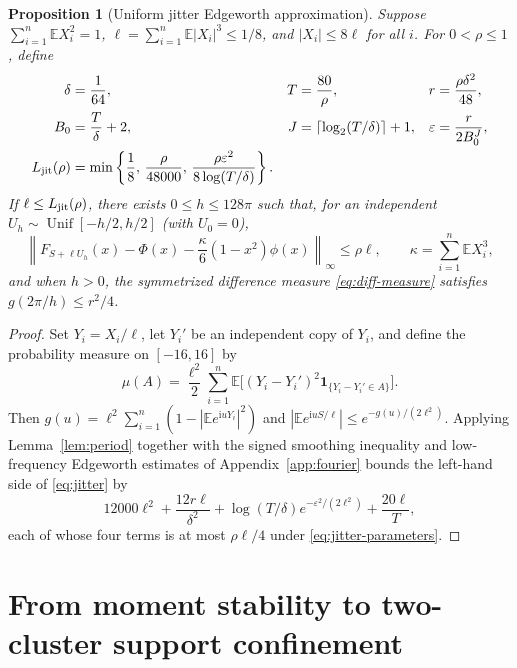 \documentclass[11pt]{article}
\numberwithin{equation}{section}
\newtheorem{proposition}[theorem]{Proposition}
\theoremstyle{remark}
\newcommand{\E}{\mathbb E}
\newcommand{\ind}{\mathbf 1}
\newcommand{\eps}{\varepsilon}
\newcommand{\ii}{\mathrm i}
\begin{document}
\begin{proposition}[Uniform jitter Edgeworth approximation]\label{prop:jitter}
Suppose $\sum_{i=1}^n\E X_i^2=1$, $\ell=\sum_{i=1}^n\E|X_i|^3\le1/8$, and
$|X_i|\le8\ell$ for all $i$. For $0<\rho\le1$, define
\begin{align}
 \delta&=\frac1{64},&T&=\frac{80}\rho,&r&=\frac{\rho\delta^2}{48},\notag\\
 B_0&=\frac T\delta+2,&J&=\lceil\log_2(T/\delta)\rceil+1,
 &\eps&=\frac r{2B_0^J},\notag\\
 L_{\rm jit}(\rho)&=
 \min\left\{\frac18,\,\frac\rho{48000},\,
              \frac{\rho\eps^2}{8\log(T/\delta)}\right\}.
                                                        \label{eq:jitter-parameters}
\end{align}
If $\ell\le L_{\rm jit}(\rho)$, there exists $0\le h\le128\pi$ such that, for
an independent $U_h\sim\operatorname{Unif}[-h/2,h/2]$ (with $U_0=0$),
\begin{equation}\label{eq:jitter}
 \left\|F_{S+\ell U_h}(x)-\Phi(x)
           -\frac\kappa6(1-x^2)\phi(x)\right\|_\infty\le\rho\ell,
 \qquad\kappa=\sum_{i=1}^n\E X_i^3,
\end{equation}
and when $h>0$, the symmetrized difference measure \eqref{eq:diff-measure}
satisfies $g(2\pi/h)\le r^2/4$.
\end{proposition}
\begin{proof}
Set $Y_i=X_i/\ell$, let $Y_i'$ be an independent copy of $Y_i$, and define
the probability measure on $[-16,16]$ by
\begin{equation}\label{eq:diff-measure}
 \mu(A)=\frac{\ell^2}{2}\sum_{i=1}^n
        \E\bigl[(Y_i-Y_i')^2\ind_{\{Y_i-Y_i'\in A\}}\bigr].
\end{equation}
Then $g(u)=\ell^2\sum_{i=1}^n(1-|\E e^{\ii uY_i}|^2)$ and
$|\E e^{\ii uS/\ell}|\le e^{-g(u)/(2\ell^2)}$. Applying Lemma~\ref{lem:period}
together with the signed smoothing inequality and low-frequency Edgeworth
estimates of Appendix~\ref{app:fourier} bounds the left-hand side of
\eqref{eq:jitter} by
\begin{equation}\label{eq:jitter-error}
 12000\ell^2+\frac{12r\ell}{\delta^2}+
       \log(T/\delta)e^{-\eps^2/(2\ell^2)}+\frac{20\ell}{T},
\end{equation}
each of whose four terms is at most $\rho\ell/4$ under \eqref{eq:jitter-parameters}.
\end{proof}

\section{From moment stability to two-cluster support confinement}\label{sec:confinement}
\end{document}
